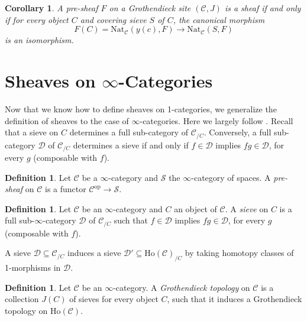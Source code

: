 \documentclass[10pt]{amsart}
\newcommand{\C}{\mathscr{C}}
\newcommand{\D}{\mathscr{D}}
\newcommand{\s}{\mathscr{S}}
\newcommand{\Ho}{\mathrm{Ho}}
\newcommand{\Nat}{\mathrm{Nat}}
\newcommand{\op}{\mathrm{op}}
\newtheorem{corollary}[equation]{Corollary}
\theoremstyle{definition}
\newtheorem{definition}[equation]{Definition}
\theoremstyle{remark}
\numberwithin{equation}{section}
\begin{document}
	\begin{corollary}
		A pre-sheaf $F$ on a Grothendieck site $(\C, J)$ is a sheaf if and only if for every object $C$ and covering sieve $S$ of $C$, the canonical morphism
		\[ F(C)  = \Nat_\C(y(c),F)\to \Nat_\C(S,F) \]
		is an isomorphism. 
	\end{corollary}
	
	\section{Sheaves on \texorpdfstring{$\infty$}{oo}-Categories}
	Now that we know how  to define sheaves on 1-categories, we generalize the definition of sheaves to the case of $\infty$-categories. Here we largely follow \cite{lurie2009htt}. Recall that a sieve on $C$ determines a full sub-category of $\C_{/C}$. Conversely, a full sub-category $\D$ of $\C_{/C}$ determines a sieve if and only if $f\in\D$ implies $fg\in\D$, for every $g$ (composable with $f$). 
	\begin{definition}
		Let $\C$ be a $\infty$-category and $\s$ the $\infty$-category of spaces. A \textit{pre-sheaf} on $\C$ is a functor $\C^{\op}\to\s$.
	\end{definition}
	\begin{definition}
		Let $\C$ be an $\infty$-category and $C$ an object of $\C$. A \textit{sieve} on $C$ is a full sub-$\infty$-category $\D$ of $\C_{/C}$ such that $f\in\D$ implies $fg\in\D$, for every $g$ (composable with $f$).  
	\end{definition}
	A sieve $\D\subseteq\C_{/C}$ induces a sieve $\D'\subseteq\Ho(\C)_{/C}$ by taking homotopy classes of 1-morphisms in $\D$. 
	\begin{definition}
		Let $\C$ be an $\infty$-category. A \emph{Grothendieck topology} on $\C$ is a collection $J(C)$ of sieves for every object $C$, such that it induces a Grothendieck topology on $\Ho(\C)$. 
	\end{definition}
	
\end{document}
